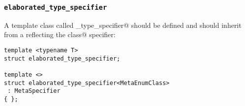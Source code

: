 \subsubsection{\texttt{elaborated\_type\_specifier}}

A template class called \verb@elaborated_type_specifier@ should be defined and should inherit from
a  reflecting the \verb@enum class@ specifier:

\begin{verbatim}
template <typename T>
struct elaborated_type_specifier;

template <>
struct elaborated_type_specifier<MetaEnumClass>
 : MetaSpecifier
{ };
\end{verbatim}

